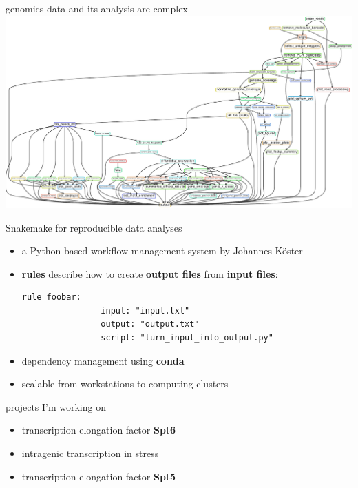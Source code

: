 \documentclass[aspectratio=169]{beamer}
\begin{document}
\begin{frame}{genomics data and its analysis are complex}
\includegraphics[width=\textwidth]{figures/rulegraph.pdf}
\end{frame}

\begin{frame}[fragile]{Snakemake for reproducible data analyses}
    \begin{itemize}
        \item a Python-based workflow management system by Johannes Köster
        \item \textbf{rules} describe how to create \textbf{output files} from \textbf{input files}:
            \begin{lstlisting}[backgroundcolor = \color{light-gray}]
            rule foobar:
                input: "input.txt"
                output: "output.txt"
                script: "turn_input_into_output.py"
            \end{lstlisting}
        \item dependency management using \textbf{conda}
        \item scalable from workstations to computing clusters
    \end{itemize}
\end{frame}

\begin{frame}{projects I'm working on}
    \begin{itemize}[]
        \setlength{\itemsep}{1cm}
        \item transcription elongation factor \textbf{Spt6}
        \item intragenic transcription in stress
        \item transcription elongation factor \textbf{Spt5}
    \end{itemize}
\end{frame}
\end{document}
